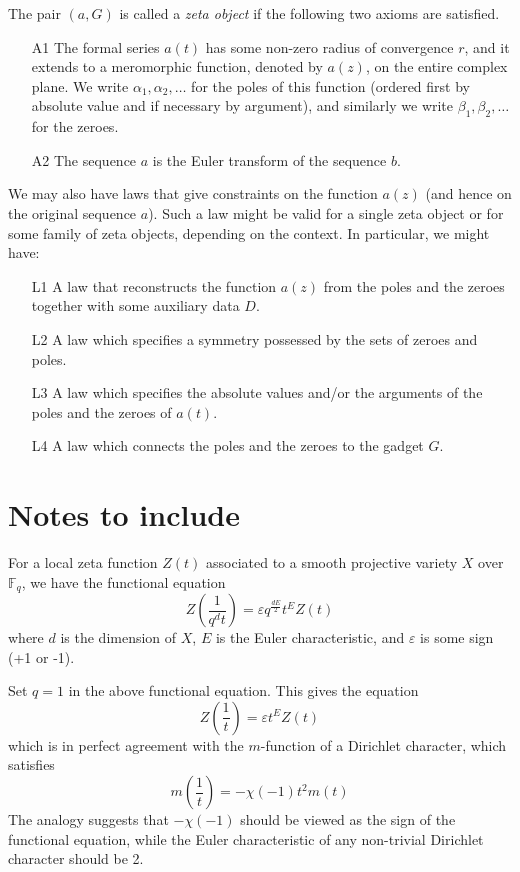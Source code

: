 \documentclass[paper=a4, fontsize=11pt]{scrartcl} %
\numberwithin{equation}{section} %
\numberwithin{figure}{section} %
\numberwithin{table}{section} %
\begin{document}
The pair $(a, G)$ is called a \emph{zeta object} if the following two axioms are satisfied.
\begin{itemize}
\item[A1] The formal series $a(t)$ has some non-zero radius of convergence $r$, and it extends to a meromorphic function, denoted by $a(z)$, on the entire complex plane. We write $\alpha_1, \alpha_2, \ldots$ for the poles of this function (ordered first by absolute value and if necessary by argument), and similarly we write $\beta_1, \beta_2, \ldots$ for the zeroes.
\item[A2] The sequence $a$ is the Euler transform of the sequence $b$.
\end{itemize}

We may also have laws that give constraints on the function $a(z)$ (and hence on the original sequence $a$). Such a law might be valid for a single zeta object or for some family of zeta objects, depending on the context. In particular, we might have:

\begin{itemize}
\item[L1] A law that reconstructs the function $a(z)$ from the poles and the zeroes together with some auxiliary data $D$.
\item[L2] A law which specifies a symmetry possessed by the sets of zeroes and poles.
\item[L3] A law which specifies the absolute values and/or the arguments of the poles and the zeroes of $a(t)$.
\item[L4] A law which connects the poles and the zeroes to the gadget $G$.
\end{itemize}



\section{Notes to include}

For a local zeta function $Z(t)$ associated to a smooth projective variety $X$ over $\mathbb{F}_q$, we have the functional equation
$$  Z \left( \frac{1}{q^d t} \right) = \varepsilon q^{\frac{dE}{2}} t^E Z(t) $$
where $d$ is the dimension of $X$, $E$ is the Euler characteristic, and $\varepsilon$ is some sign (+1 or -1).

Set $q=1$ in the above functional equation. This gives the equation
$$  Z \left( \frac{1}{t} \right) = \varepsilon t^E Z(t) $$
which is in perfect agreement with the $m$-function of a Dirichlet character, which satisfies
$$  m \left( \frac{1}{t} \right) = -\chi(-1) t^2 m(t) $$
The analogy suggests that $-\chi(-1)$ should be viewed as the sign of the functional equation, while the Euler characteristic of any non-trivial Dirichlet character should be 2.
\end{document}

